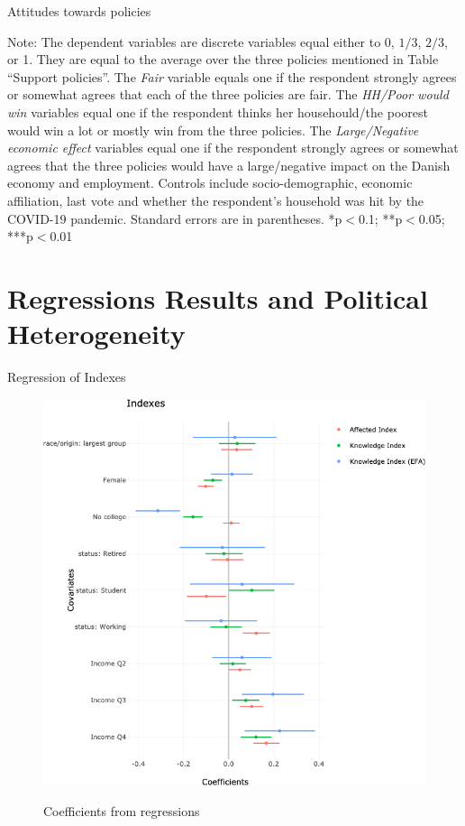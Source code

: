 \documentclass[aspectratio=169,9pt,dvipsnames]{beamer}
\begin{document}
\begin{frame}{}%
\begin{table}[h!]
\caption{Attitudes towards policies}
\begin{center}
\scalebox{.7}{}
\end{center}
	{\scriptsize Note: The dependent variables are discrete variables equal either to 0, $1/3$, $2/3$, or 1. They are equal to the average over the three policies mentioned in Table ``Support policies''. The \textit{Fair} variable equals one if the respondent strongly agrees or somewhat agrees that each of the three policies are fair. The \textit{HH/Poor would win} variables equal one if the respondent thinks her househould/the poorest would win a lot or mostly win from the three policies. The \textit{Large/Negative economic effect} variables equal one if the respondent strongly agrees or somewhat agrees that the three policies would have a large/negative impact on the Danish economy and employment. 
	\newline Controls include socio-demographic, economic affiliation, last vote and whether the respondent's household was hit by the COVID-19 pandemic. Standard errors are in parentheses. *p$<$0.1; **p$<$0.05; ***p$<$0.01}
\end{table}
\end{frame}

\section{Regressions Results and Political Heterogeneity}

\begin{frame}{Regression of Indexes}%
\vspace{-.5cm}
\begin{figure}[h!]
\caption{Coefficients from regressions}
\includegraphics[width=.5\textwidth]{../figures/DK/coef_indexes_DK.png} \\
\end{figure}
\end{frame}
\end{document}
